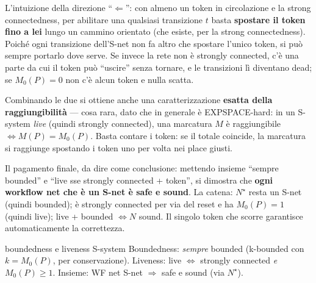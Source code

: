 L'intuizione della direzione ``$\Leftarrow$'': con almeno un token in circolazione e la strong connectedness, per abilitare una qualsiasi transizione $t$ basta \textbf{spostare il token fino a lei} lungo un cammino orientato (che esiste, per la strong connectedness). Poiché ogni transizione dell'S-net non fa altro che spostare l'unico token, si può sempre portarlo dove serve. Se invece la rete non è strongly connected, c'è una parte da cui il token può ``uscire'' senza tornare, e le transizioni lì diventano dead; se $M_0(P) = 0$ non c'è alcun token e nulla scatta.

Combinando le due si ottiene anche una caratterizzazione \textbf{esatta della raggiungibilità} — cosa rara, dato che in generale è EXPSPACE-hard: in un S-system \emph{live} (quindi strongly connected), una marcatura $M$ è raggiungibile $\iff M(P) = M_0(P)$. Basta contare i token: se il totale coincide, la marcatura si raggiunge spostando i token uno per volta nei place giusti.

Il pagamento finale, da dire come conclusione: mettendo insieme ``sempre bounded'' e ``live sse strongly connected + token'', si dimostra che \textbf{ogni workflow net che è un S-net è safe e sound}. La catena: $N^\star$ resta un S-net (quindi bounded); è strongly connected per via del reset e ha $M_0(P) = 1$ (quindi live); live + bounded $\iff N$ sound. Il singolo token che scorre garantisce automaticamente la correttezza.

\begin{puntochiave}{boundedness e liveness S-system}
Boundedness: \emph{sempre} bounded (k-bounded con $k=M_0(P)$, per conservazione). Liveness: live $\iff$ strongly connected \emph{e} $M_0(P)\ge 1$. Insieme: WF net S-net $\Rightarrow$ safe e sound (via $N^\star$).
\end{puntochiave}
